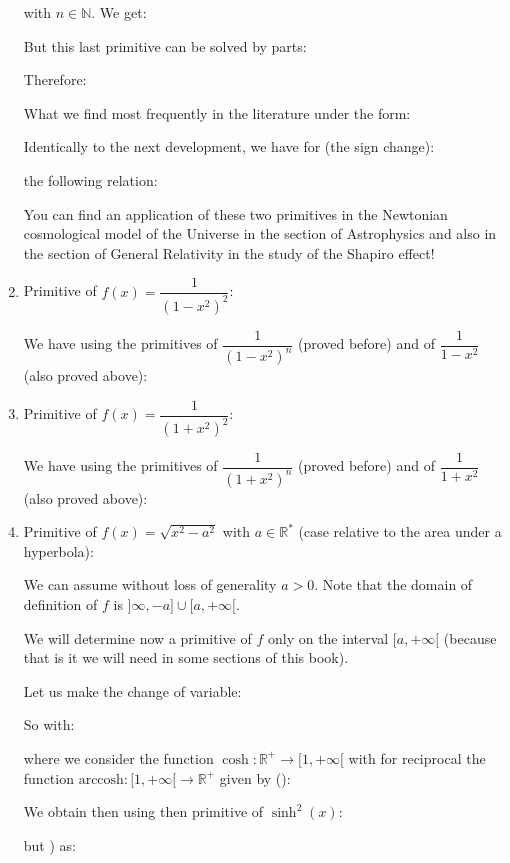 \begin{enumerate}
		with $n \in \mathbb{N}$. We get:
		
		But this last primitive can be solved by parts:
		
		Therefore:
		
		What we find most frequently in the literature under the form:
		
		Identically to the next development, we have for (the sign change):
		
		the following relation:
		
		You can find an application of these two primitives in the Newtonian cosmological model of the Universe in the section of Astrophysics and also in the section of General Relativity in the study of the Shapiro effect!
		
		\item Primitive of $f(x)=\dfrac{1}{(1-x^2)^2}$:
		
		We have using the primitives of $\dfrac{1}{(1-x^2)^n}$ (proved before) and of $\dfrac{1}{1-x^2}$ (also proved above):
		
		
		\item Primitive of $f(x)=\dfrac{1}{(1+x^2)^2}$:
		
		We have using the primitives of $\dfrac{1}{(1+x^2)^n}$ (proved before) and of $\dfrac{1}{1+x^2}$ (also proved above):
		
		
		\item Primitive of $f(x)=\sqrt{x^2-a^2}$ with $a\in \mathbb{R}^*$ (case relative to the area under a hyperbola):
		
		We can assume without loss of generality $a>0$. Note that the domain of definition of $f$ is $]\infty,-a] \cup [a,+\infty[$.
		
		We will determine now a primitive of $f$ only on the interval $[a,+\infty[$ (because that is it we will need in some sections of this book).
		
		Let us make the change of variable:
		
		So with:
		
		where we consider the function $\cosh: \mathbb{R}^+ \rightarrow [1,+\infty[$ with for reciprocal the function $\text{arccosh}:[1,+\infty[ \rightarrow \mathbb{R}^+$ given by ():
		
		We obtain then using then primitive of $\sinh^2(x)$:
		
		but ) as:
		

\end{enumerate}
